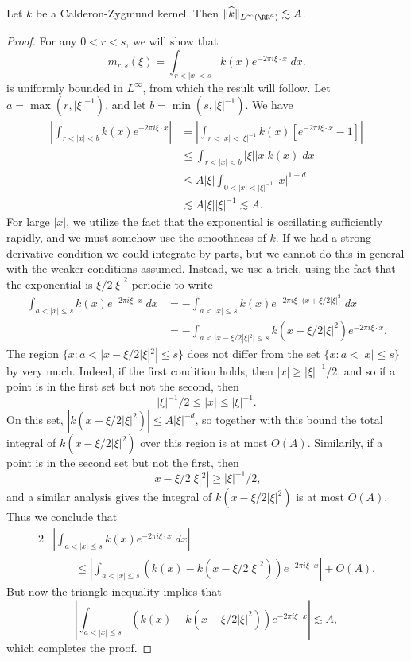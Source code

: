 \begin{lemma}
    Let $k$ be a Calderon-Zygmund kernel. Then $\| \widehat{k} \|_{L^\infty(\RR^d)} \lesssim A$.
\end{lemma}
\begin{proof}
    For any $0 < r < s$, we will show that
    \[ m_{r,s}(\xi) = \int_{r < |x| < s} k(x) e^{-2 \pi i \xi \cdot x}\; dx. \]
    is uniformly bounded in $L^\infty$, from which the result will follow. Let $a = \max(r,|\xi|^{-1})$, and let $b = \min(s,|\xi|^{-1})$. We have
    \begin{align*}
        \left| \int_{r < |x| < b} k(x) e^{-2 \pi i \xi \cdot x} \right| &= \left| \int_{r < |x| < |\xi|^{-1}} k(x) [e^{-2 \pi i \xi \cdot x} - 1] \right|\\
        &\leq \int_{r < |x| < b} |\xi| |x| k(x)\; dx\\
        &\leq A |\xi| \int_{0 < |x| < |\xi|^{-1}} |x|^{1-d}\\
        &\lesssim A |\xi| |\xi|^{-1} \lesssim A.
    \end{align*}
    For large $|x|$, we utilize the fact that the exponential is oscillating sufficiently rapidly, and we must somehow use the smoothness of $k$. If we had a strong derivative condition we could integrate by parts, but we cannot do this in general with the weaker conditions assumed. Instead, we use a trick, using the fact that the exponential is $\xi/2 |\xi|^2$ periodic to write
    \begin{align*}
        \int_{a < |x| \leq s} k(x) e^{-2 \pi i \xi \cdot x}\; dx &= - \int_{a < |x| \leq s} k(x) e^{-2 \pi i \xi \cdot (x + \xi / 2 |\xi|^2}\; dx\\
        &= - \int_{a < |x - \xi / 2 |\xi|^2| \leq s} k(x - \xi / 2 |\xi|^2) e^{-2 \pi i \xi \cdot x}.
    \end{align*}
    The region $\{ x : a < |x - \xi / 2 |\xi|^2 | \leq s \}$ does not differ from the set $\{ x : a < |x| \leq s \}$ by very much. Indeed, if the first condition holds, then $|x| \geq |\xi|^{-1} / 2$, and so if a point is in the first set but not the second, then
    \[ |\xi|^{-1} / 2 \leq |x| \leq |\xi|^{-1}. \]
    On this set, $|k(x - \xi / 2 |\xi|^2)| \leq A |\xi|^{-d}$, so together with this bound the total integral of $k(x - \xi / 2 |\xi|^2)$ over this region is at most $O(A)$. Similarily, if a point is in the second set but not the first, then
    \[ |x - \xi / 2 |\xi|^2| \geq |\xi|^{-1}/2, \]
    and a similar analysis gives the integral of $k(x - \xi / 2|\xi|^2)$ is at most $O(A)$. Thus we conclude that
    \begin{align*}
        2& \left| \int_{a < |x| \leq s} k(x) e^{-2 \pi i \xi \cdot x}\; dx \right|\\
        &\quad\quad \leq \left| \int_{a < |x| \leq s} (k(x) - k(x - \xi / 2 |\xi|^2)) e^{-2 \pi i \xi \cdot x} \right| + O(A).
    \end{align*}
    But now the triangle inequality implies that
    \[ \left| \int_{a < |x| \leq s} (k(x) - k(x - \xi / 2 |\xi|^2)) e^{-2 \pi i \xi \cdot x} \right| \lesssim A, \]
    which completes the proof.
\end{proof}

